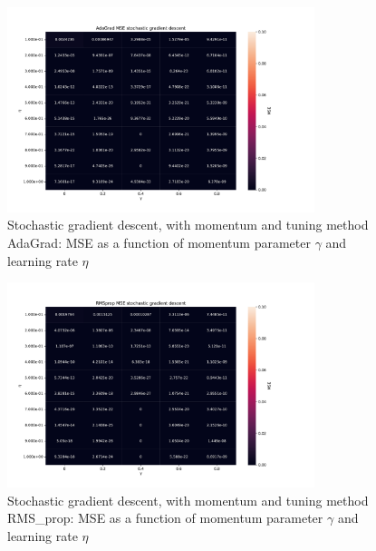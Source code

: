 \begin{figure}[H]
\centering
\includegraphics[width=0.8\textwidth]{Figures/PartA/AdaGrad_sgdm_MSE(eta,momentum)}
\caption{Stochastic gradient descent, with momentum and tuning method AdaGrad:
    MSE as a function of momentum parameter $\gamma$ and learning rate \(\eta \)	 }
\label{fig:AdaGrad_sgdm_MSE-eta-momentum-}
\end{figure}

\begin{figure}[H]
\centering
\includegraphics[width=0.8\textwidth]{Figures/PartA/RMSprop_sgdm_MSE(eta,momentum)}
\caption{Stochastic gradient descent, with momentum and tuning method
    RMS\_prop: MSE as a function of momentum parameter $\gamma$ and learning
    rate \(\eta \)	 }
\label{fig:RMSprop_sgdm_MSE-eta-momentum-}
\end{figure}

